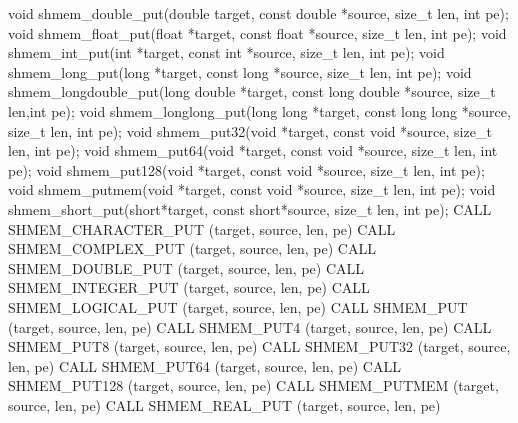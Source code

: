 \synC   %
void shmem_double_put(double target, const double *source, size_t len, int pe);
void shmem_float_put(float *target, const float *source, size_t len, int pe);
void shmem_int_put(int *target, const int *source, size_t len, int pe);
void shmem_long_put(long *target, const long *source, size_t len, int pe);
void shmem_longdouble_put(long double *target, const long double *source, size_t len,int pe);
void shmem_longlong_put(long long *target, const long long *source, size_t len, int pe);
void shmem_put32(void *target, const void *source, size_t len, int pe);
void shmem_put64(void *target, const void *source, size_t len, int pe);
void shmem_put128(void *target, const void *source, size_t len, int pe);
void shmem_putmem(void *target, const void *source, size_t len, int pe);
void shmem_short_put(short*target, const short*source, size_t len, int pe);
\synF   %
CALL SHMEM_CHARACTER_PUT (target, source, len, pe)
CALL SHMEM_COMPLEX_PUT (target, source, len, pe)
CALL SHMEM_DOUBLE_PUT (target, source, len, pe)
CALL SHMEM_INTEGER_PUT (target, source, len, pe)
CALL SHMEM_LOGICAL_PUT (target, source, len, pe)
CALL SHMEM_PUT (target, source, len, pe)
CALL SHMEM_PUT4 (target, source, len, pe)
CALL SHMEM_PUT8 (target, source, len, pe)
CALL SHMEM_PUT32 (target, source, len, pe)
CALL SHMEM_PUT64 (target, source, len, pe)
CALL SHMEM_PUT128 (target, source, len, pe)
CALL SHMEM_PUTMEM (target, source, len, pe)
CALL SHMEM_REAL_PUT (target, source, len, pe)

